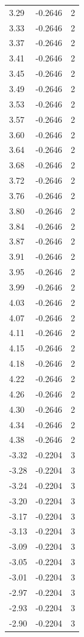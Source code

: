 \begin{longtable}{lrr}
  3.29 & -0.2646 & 2 \\
  3.33 & -0.2646 & 2 \\
  3.37 & -0.2646 & 2 \\
  3.41 & -0.2646 & 2 \\
  3.45 & -0.2646 & 2 \\
  3.49 & -0.2646 & 2 \\
  3.53 & -0.2646 & 2 \\
  3.57 & -0.2646 & 2 \\
  3.60 & -0.2646 & 2 \\
  3.64 & -0.2646 & 2 \\
  3.68 & -0.2646 & 2 \\
  3.72 & -0.2646 & 2 \\
  3.76 & -0.2646 & 2 \\
  3.80 & -0.2646 & 2 \\
  3.84 & -0.2646 & 2 \\
  3.87 & -0.2646 & 2 \\
  3.91 & -0.2646 & 2 \\
  3.95 & -0.2646 & 2 \\
  3.99 & -0.2646 & 2 \\
  4.03 & -0.2646 & 2 \\
  4.07 & -0.2646 & 2 \\
  4.11 & -0.2646 & 2 \\
  4.15 & -0.2646 & 2 \\
  4.18 & -0.2646 & 2 \\
  4.22 & -0.2646 & 2 \\
  4.26 & -0.2646 & 2 \\
  4.30 & -0.2646 & 2 \\
  4.34 & -0.2646 & 2 \\
  4.38 & -0.2646 & 2 \\
  -3.32 & -0.2204 & 3 \\
  -3.28 & -0.2204 & 3 \\
  -3.24 & -0.2204 & 3 \\
  -3.20 & -0.2204 & 3 \\
  -3.17 & -0.2204 & 3 \\
  -3.13 & -0.2204 & 3 \\
  -3.09 & -0.2204 & 3 \\
  -3.05 & -0.2204 & 3 \\
  -3.01 & -0.2204 & 3 \\
  -2.97 & -0.2204 & 3 \\
  -2.93 & -0.2204 & 3 \\
  -2.90 & -0.2204 & 3 \\

\end{longtable}
